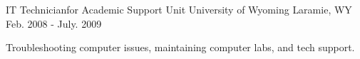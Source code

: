 \begin{cventries}

\cventry
{IT Technicianfor Academic Support Unit} %
{University of Wyoming} %
{Laramie, WY} %
{Feb. 2008 - July. 2009} %
{ %
\begin{cvitems}
\item {Troubleshooting computer issues, maintaining computer labs, and tech support.}
\end{cvitems}
}


\end{cventries}